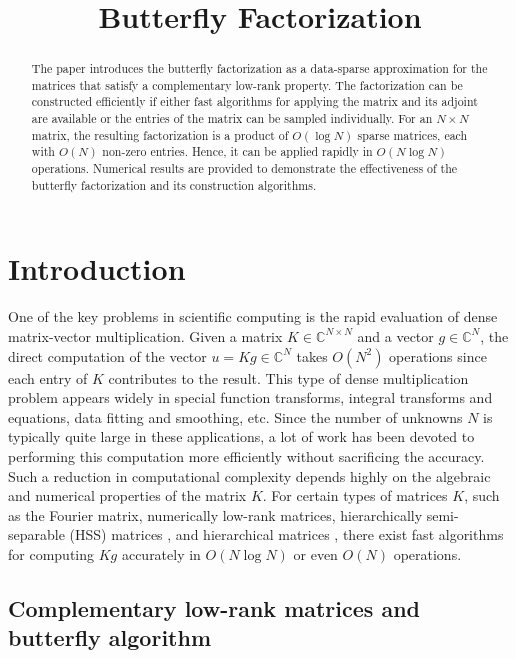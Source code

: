 \title{Butterfly Factorization}

\begin{abstract}
The paper introduces the butterfly factorization as a data-sparse approximation for the matrices that satisfy a complementary low-rank property. The factorization can be constructed efficiently if either fast algorithms for applying the matrix and its adjoint are available or the entries of the matrix can be sampled individually. For an
$N\times N$ matrix, the resulting factorization is a product of
$O(\log N)$ sparse matrices, each with $O(N)$ non-zero entries. Hence, it can be applied rapidly in $O(N\log N)$ operations. Numerical results are provided to demonstrate the effectiveness of the butterfly factorization and its construction algorithms.
\end{abstract}

\section{Introduction}
\label{sec:intro}

One of the key problems in scientific computing is the rapid evaluation of dense matrix-vector multiplication. Given a matrix $K
\in \mathbb{C}^{N\times N}$ and a vector $g\in\mathbb{C}^N$, the direct computation of the vector $u=Kg\in \mathbb{C}^N$ takes $O(N^2)$ operations since each entry of $K$ contributes to the result. This type of dense multiplication problem appears widely in special function transforms, integral transforms and equations, data fitting and smoothing, etc. Since the number of unknowns $N$ is typically quite large in these applications, a lot of work has been devoted to performing this computation more efficiently without sacrificing the accuracy. Such a reduction in computational complexity depends highly on the algebraic and numerical properties of the matrix $K$. For certain types of matrices $K$, such as the Fourier matrix, numerically low-rank matrices, hierarchically semi-separable ({HSS}) matrices \cite{HSS1}, and hierarchical matrices \cite{HSS2,HMat}, there exist fast algorithms for computing $Kg$ accurately in $O(N\log N)$ or even $O(N)$ operations.

\subsection{Complementary low-rank matrices and butterfly algorithm}

